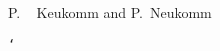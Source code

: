 \documentclass{article}
\begin{document}
P. ~ Keukomm and P.~Neukomm

\texttt{\char`\ffi}
\end{document}

